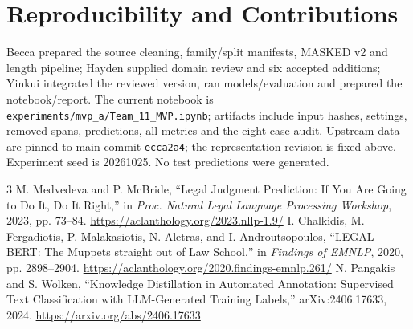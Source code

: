 \documentclass[conference]{IEEEtran}
\begin{document}
\section*{Reproducibility and Contributions}
Becca prepared the source cleaning, family/split manifests, MASKED v2 and length pipeline; Hayden supplied domain review and six accepted additions; Yinkui integrated the reviewed version, ran models/evaluation and prepared the notebook/report. The current notebook is \texttt{experiments/mvp\_a/Team\_11\_MVP.ipynb}; artifacts include input hashes, settings, removed spans, predictions, all metrics and the eight-case audit. Upstream data are pinned to main commit \texttt{ecca2a4}; the representation revision is fixed above. Experiment seed is 20261025. No test predictions were generated.

\begin{thebibliography}{3}
 M. Medvedeva and P. McBride, ``Legal Judgment Prediction: If You Are Going to Do It, Do It Right,'' in \emph{Proc. Natural Legal Language Processing Workshop}, 2023, pp. 73--84. \url{https://aclanthology.org/2023.nllp-1.9/}
 I. Chalkidis, M. Fergadiotis, P. Malakasiotis, N. Aletras, and I. Androutsopoulos, ``LEGAL-BERT: The Muppets straight out of Law School,'' in \emph{Findings of EMNLP}, 2020, pp. 2898--2904. \url{https://aclanthology.org/2020.findings-emnlp.261/}
 N. Pangakis and S. Wolken, ``Knowledge Distillation in Automated Annotation: Supervised Text Classification with LLM-Generated Training Labels,'' arXiv:2406.17633, 2024. \url{https://arxiv.org/abs/2406.17633}
\end{thebibliography}
\end{document}

